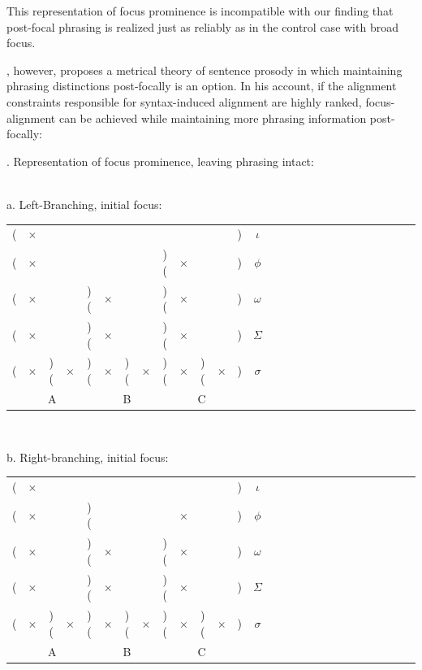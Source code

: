 \documentclass[preprint,review,12pt,authoryear,times]{elsarticle}
\newcommand{\g}{$\times$}
\begin{document}
This representation of focus prominence is incompatible with our finding that post-focal phrasing is realized just as reliably as in the control case with broad focus. 

\citet{truck95}, however, proposes a metrical theory of sentence prosody in which maintaining phrasing distinctions post-focally is an option. In his account, if the alignment constraints responsible for syntax-induced alignment are highly ranked, focus-alignment can be achieved while maintaining more phrasing information post-focally:



\ex. Representation of focus prominence, leaving phrasing intact:\\\label{focusrep}
\vspace{-10pt}
\ \\
\parbox{2in}{\footnotesize a. Left-Branching, initial focus:\\
\vspace{-12pt}
\setlength{\unitlength}{1cm}
\setlength\extrarowheight{-3pt}
\begin{tabular}{ccccccccccccccccccccccccccc}
 (&\g&&&&&&&&&&&)&\em $\iota$\\
(&\g&&&&&&&)(&\g&&&)&$\phi$\\
(&\g&&&)(&\g&&&)(&\g&&&)&$\omega$\\
(&\g&&&)(&\g&&&)(&\g&&&)&$\Sigma$\\
(&\g&)(&\g&)(&\g&)(&\g&)(&\g&)(&\g&)&$\sigma$\\
\multicolumn{5}{c}{A}&\multicolumn{3}{c}{B}&\multicolumn{5}{c}{C}\\
\end{tabular}
 }
 \vspace{10pt}
  \ \\
\parbox{2in}{\footnotesize b. Right-branching, initial focus:\\
\vspace{-12pt}
\setlength{\unitlength}{1cm}
\setlength\extrarowheight{-3pt}
\begin{tabular}{ccccccccccccccccccccccccccc}
(&\g&&&&&&&&&&&)&\em $\iota$\\
(&\g&&&)(&&&&&\g&&&)&$\phi$\\
(&\g&&&)(&\g&&&)(&\g&&&)&$\omega$\\
(&\g&&&)(&\g&&&)(&\g&&&)&$\Sigma$\\
(&\g&)(&\g&)(&\g&)(&\g&)(&\g&)(&\g&)&$\sigma$\\
\multicolumn{5}{c}{A}&\multicolumn{3}{c}{B}&\multicolumn{5}{c}{C}\\
\end{tabular}
}\label{feryfocus}
\end{document}
